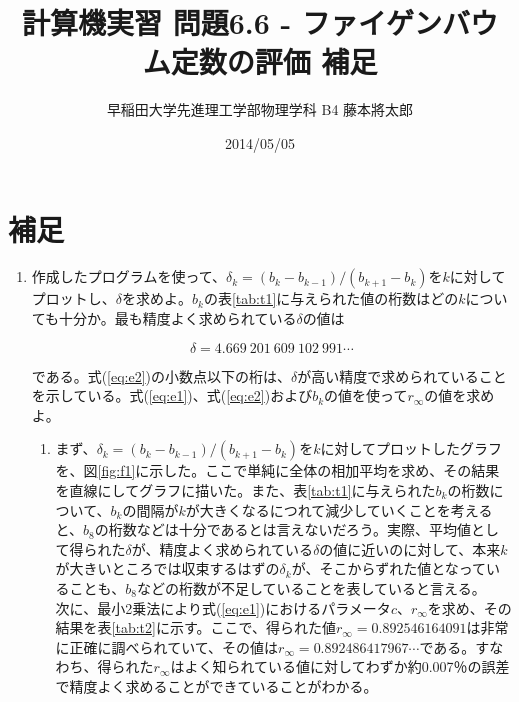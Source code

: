 \documentclass{jsarticle}
\title{計算機実習 問題6.6 - ファイゲンバウム定数の評価 補足}
\author{早稲田大学先進理工学部物理学科 B4 藤本將太郎}
\date{2014/05/05}
\begin{document}
\maketitle

\section{補足}

\begin{enumerate}
 \renewcommand{\labelenumi}{\alph{enumi}.}
 \renewcommand{\labelenumii}{}

 \item 作成したプログラムを使って、$\delta_{k}=(b_{k}-b_{k-1})/(b_{k+1}-b_{k})$を$k$に対してプロットし、$\delta$を求めよ。$b_{k}$の表\ref{tab:t1}に与えられた値の桁数はどの$k$についても十分か。最も精度よく求められている$\delta$の値は
 
 \begin{equation}
  \delta = 4.669\ 201\ 609\ 102\ 991 \cdots
  \label{eq:e2}
 \end{equation}

 である。式(\ref{eq:e2})の小数点以下の桁は、$\delta$が高い精度で求められていることを示している。式(\ref{eq:e1})、式(\ref{eq:e2})および$b_{k}$の値を使って$r_{\infty}$の値を求めよ。

 
  \begin{enumerate}
   \item まず、$\delta_{k}=(b_{k}-b_{k-1})/(b_{k+1}-b_{k})$を$k$に対してプロットしたグラフを、図\ref{fig:f1}に示した。ここで単純に全体の相加平均を求め、その結果を直線にしてグラフに描いた。また、表\ref{tab:t1}に与えられた$b_{k}$の桁数について、$b_{k}$の間隔が$k$が大きくなるにつれて減少していくことを考えると、$b_{8}$の桁数などは十分であるとは言えないだろう。実際、平均値として得られた$\delta$が、精度よく求められている$\delta$の値に近いのに対して、本来$k$が大きいところでは収束するはずの$\delta_{k}$が、そこからずれた値となっていることも、$b_{8}$などの桁数が不足していることを表していると言える。\\
   次に、最小2乗法により式(\ref{eq:e1})におけるパラメータ$c$、$r_{\infty}$を求め、その結果を表\ref{tab:t2}に示す。ここで、得られた値$r_{\infty}=0.892 546 164 091$は非常に正確に調べられていて、その値は$r_{\infty}=0.892 486 417 967 \cdots$である。すなわち、得られた$r_{\infty}$はよく知られている値に対してわずか約0.007％の誤差で精度よく求めることができていることがわかる。


\end{enumerate}
\end{enumerate}
\end{document}
